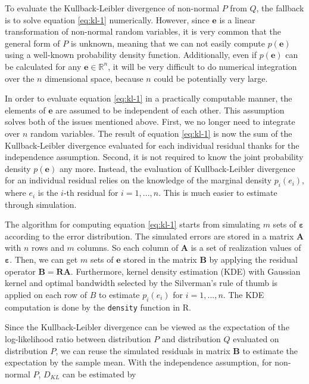 \documentclass[]{interact}
\theoremstyle{plain}%
\theoremstyle{definition}
\theoremstyle{remark}
\begin{document}
To evaluate the Kullback-Leibler divergence of non-normal \(P\) from
\(Q\), the fallback is to solve equation \ref{eq:kl-1} numerically.
However, since \(\boldsymbol{e}\) is a linear transformation of
non-normal random variables, it is very common that the general form of
\(P\) is unknown, meaning that we can not easily compute
\(p(\boldsymbol{e})\) using a well-known probability density function.
Additionally, even if \(p(\boldsymbol{e})\) can be calculated for any
\(\boldsymbol{e} \in \mathbb{R}^n\), it will be very difficult to do
numerical integration over the \(n\) dimensional space, because \(n\)
could be potentially very large.

In order to evaluate equation \ref{eq:kl-1} in a practically computable
manner, the elements of \(\boldsymbol{e}\) are assumed to be independent
of each other. This assumption solves both of the issues mentioned
above. First, we no longer need to integrate over \(n\) random
variables. The result of equation \ref{eq:kl-1} is now the sum of the
Kullback-Leibler divergence evaluated for each individual residual
thanks for the independence assumption. Second, it is not required to
know the joint probability density \(p(\boldsymbol{e})\) any more.
Instead, the evaluation of Kullback-Leibler divergence for an individual
residual relies on the knowledge of the marginal density \(p_i(e_i)\),
where \(e_i\) is the \(i\)-th residual for \(i = 1, ..., n\). This is
much easier to estimate through simulation.

The algorithm for computing equation \ref{eq:kl-1} starts from
simulating \(m\) sets of \(\boldsymbol{\varepsilon}\) according to the
error distribution. The simulated errors are stored in a matrix
\(\boldsymbol{A}\) with \(n\) rows and \(m\) columns. So each column of
\(\boldsymbol{A}\) is a set of realization values of
\(\boldsymbol{\varepsilon}\). Then, we can get \(m\) sets of
\(\boldsymbol{e}\) stored in the matrix \(\boldsymbol{B}\) by applying
the residual operator \(\boldsymbol{B} = \boldsymbol{R}\boldsymbol{A}\).
Furthermore, kernel density estimation (KDE) with Gaussian kernel and
optimal bandwidth selected by the Silverman's rule of thumb
\citep{silverman2018density} is applied on each row of \(B\) to estimate
\(p_i(e_i)\) for \(i = 1, ..., n\). The KDE computation is done by the
\texttt{density} function in R.

Since the Kullback-Leibler divergence can be viewed as the expectation
of the log-likelihood ratio between distribution \(P\) and distribution
\(Q\) evaluated on distribution \(P\), we can reuse the simulated
residuals in matrix \(\boldsymbol{B}\) to estimate the expectation by
the sample mean. With the independence assumption, for non-normal \(P\),
\(D_{KL}\) can be estimated by
\end{document}
